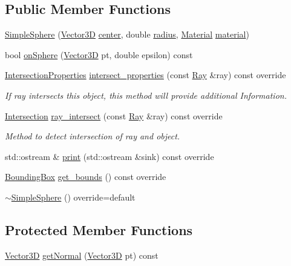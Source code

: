 \subsection*{Public Member Functions}
\begin{DoxyCompactItemize}
\item 
\mbox{\hyperlink{classSimpleSphere_ae893a4b886a92fe81e1b46766faaf6cd}{Simple\+Sphere}} (\mbox{\hyperlink{classVector3D}{Vector3D}} \mbox{\hyperlink{classSimpleSphere_af432089b8146295c77f52f22835bf1ab}{center}}, double \mbox{\hyperlink{classSimpleSphere_ad69dbac136ee99110f41b7b84656b144}{radius}}, \mbox{\hyperlink{classMaterial}{Material}} \mbox{\hyperlink{classSimpleSphere_abfb049ac4dabb0c7fbb78d7791e33e42}{material}})
\item 
bool \mbox{\hyperlink{classSimpleSphere_a208080863a70c6209689a6b4369a7b8b}{on\+Sphere}} (\mbox{\hyperlink{classVector3D}{Vector3D}} pt, double epsilon) const
\item 
\mbox{\hyperlink{classIntersectionProperties}{Intersection\+Properties}} \mbox{\hyperlink{classSimpleSphere_a4c71f3e8197f40c18cee7508f2fd3e9c}{intersect\+\_\+properties}} (const \mbox{\hyperlink{classRay}{Ray}} \&ray) const override
\begin{DoxyCompactList}\small\item\em If ray intersects this object, this method will provide additional Information. \end{DoxyCompactList}\item 
\mbox{\hyperlink{classIntersection}{Intersection}} \mbox{\hyperlink{classSimpleSphere_abb50f169da7cb2acab05c8f9d56cd1e8}{ray\+\_\+intersect}} (const \mbox{\hyperlink{classRay}{Ray}} \&ray) const override
\begin{DoxyCompactList}\small\item\em Method to detect intersection of ray and object. \end{DoxyCompactList}\item 
std\+::ostream \& \mbox{\hyperlink{classSimpleSphere_a2da3c9e41a8d8e6ec4012343ea0fa793}{print}} (std\+::ostream \&sink) const override
\item 
\mbox{\hyperlink{classBoundingBox}{Bounding\+Box}} \mbox{\hyperlink{classSimpleSphere_aa5b6b2ebbe3de4490cdaa0f5c08b961c}{get\+\_\+bounds}} () const override
\item 
\mbox{\hyperlink{classSimpleSphere_a7ffaeb08624ecd5c91ed88c10f2fbff7}{$\sim$\+Simple\+Sphere}} () override=default
\end{DoxyCompactItemize}
\subsection*{Protected Member Functions}
\begin{DoxyCompactItemize}
\item 
\mbox{\hyperlink{classVector3D}{Vector3D}} \mbox{\hyperlink{classSimpleSphere_a792d6ab934b8015c607a632aa0d169bd}{get\+Normal}} (\mbox{\hyperlink{classVector3D}{Vector3D}} pt) const
\end{DoxyCompactItemize}
